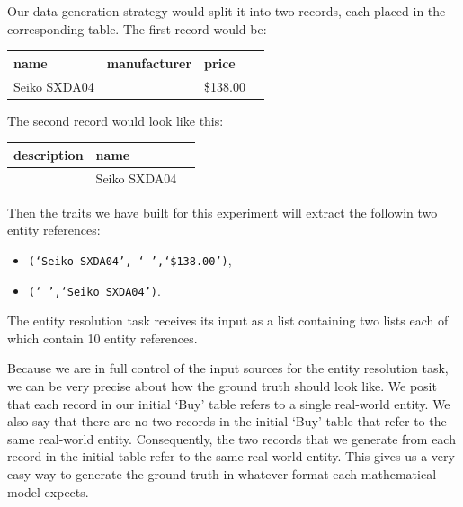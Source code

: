 \documentclass[11pt]{article}
\begin{document}
    Our data generation strategy would split it into two records, each placed
    in the corresponding table.
    The first record would be:
    
    \begin{center}
        \begin{tabular}[b]{|l|l|l|l|}
            \hline
            name&manufacturer&price \\
            \hline
            Seiko SXDA04& &\$138.00 \\
            \hline
        \end{tabular}
    \end{center}

    The second record would look like this:

    \begin{center}
        \begin{tabular}[b]{|l|l|l|}
            \hline
            description&name \\
            \hline
            &Seiko SXDA04 \\
            \hline
        \end{tabular}
    \end{center}

    Then the traits we have built for this experiment will extract the followin
    two entity references:
    \begin{itemize}
        \item \texttt{(`Seiko SXDA04', ` ',`\$138.00')},
        \item \texttt{(` ',`Seiko SXDA04')}.
    \end{itemize}

    The entity resolution task receives its input as a list containing two lists
    each of which contain 10 entity references.

    Because we are in full control of the input sources for the entity
    resolution task, we can be very precise about how the ground truth should
    look like.
    We posit that each record in our initial `Buy' table refers to a single
    real-world entity.
    We also say that there are no two records in the initial `Buy' table that
    refer to the same real-world entity.
    Consequently, the two records that we generate from each record in the
    initial table refer to the same real-world entity.
    This gives us a very easy way to generate the ground truth in whatever
    format each mathematical model expects.
\end{document}
